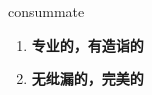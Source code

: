 
\begin{frame}
{\huge consummate}
\begin{center}
\begin{enumerate}\Large
  \item \textbf{专业的，有造诣的}
  \item \textbf{无纰漏的，完美的}
\end{enumerate}
\end{center}
\end{frame}
